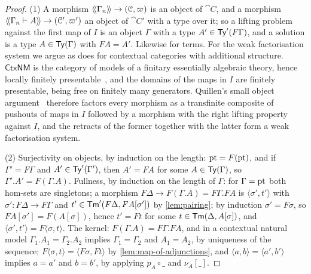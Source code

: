 \begin{proof}
    (1) A morphism $\langle\!\langle \Gamma_n \rangle\!\rangle \to (\mathcal{C}, \varpi)$ is an object of $\cat{C}$, and a morphism $\langle\!\langle \Gamma_n \vdash A \rangle\!\rangle \to (\mathcal{C}', \varpi')$ an object of $\cat{C}'$ with a type over it; so a lifting problem against the first map of $I$ is an object $\Gamma$ with a type $A' \in \mathsf{Ty}'(F\Gamma)$, and a solution is a type $A \in \mathsf{Ty}(\Gamma)$ with $FA = A'$. Likewise for terms. For the weak factorisation system we argue as \cite[Prop.~3.12]{KapulkinLumsdaine2018} does for contextual categories with additional structure. $\mathsf{CtxNM}$ is the category of models of a finitary essentially algebraic theory, hence locally finitely presentable~\cite[Thm.~3.36]{AdamekRosicky1994}, and the domains of the maps in $I$ are finitely presentable, being free on finitely many generators. Quillen's small object argument~\cite[Thm.~12.2.2]{Riehl2014} therefore factors every morphism as a transfinite composite of pushouts of maps in $I$ followed by a morphism with the right lifting property against $I$, and the retracts of the former together with the latter form a weak factorisation system.

    (2) Surjectivity on objects, by induction on the length: $\mathrm{pt} = F(\mathrm{pt})$, and if $\Gamma' = F\Gamma$ and $A' \in \mathsf{Ty}'(\Gamma')$, then $A' = FA$ for some $A \in \mathsf{Ty}(\Gamma)$, so $\Gamma'.A' = F(\Gamma.A)$. Fullness, by induction on the length of $\Gamma$: for $\Gamma = \mathrm{pt}$ both hom-sets are singletons; a morphism $F\Delta \to F(\Gamma.A) = F\Gamma.FA$ is $\langle \sigma', t' \rangle$ with $\sigma' : F\Delta \to F\Gamma$ and $t' \in \mathsf{Tm}'(F\Delta, FA[\sigma'])$ by \cref{lem:pairing}; by induction $\sigma' = F\sigma$, so $FA[\sigma'] = F(A[\sigma])$, hence $t' = Ft$ for some $t \in \mathsf{Tm}(\Delta, A[\sigma])$, and $\langle \sigma', t' \rangle = F\langle \sigma, t \rangle$. The kernel: $F(\Gamma.A) = F\Gamma.FA$, and in a contextual natural model $\Gamma_1.A_1 = \Gamma_2.A_2$ implies $\Gamma_1 = \Gamma_2$ and $A_1 = A_2$, by uniqueness of the sequence; $F\langle \sigma, t \rangle = \langle F\sigma, Ft \rangle$ by \cref{lem:map-of-adjunctions}, and $\langle a, b \rangle = \langle a', b' \rangle$ implies $a = a'$ and $b = b'$, by applying $p_A \circ \_$ and $\nu_A[\_]$.


\end{proof}
